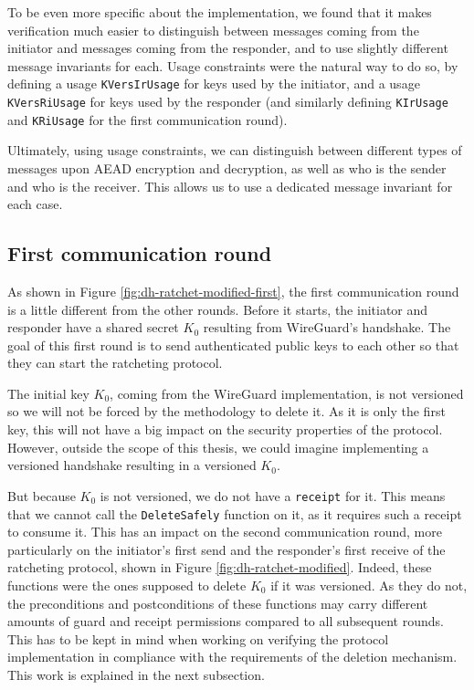 To be even more specific about the implementation, we found that it makes verification much easier to distinguish between messages coming from the initiator and messages coming from the responder, and to use slightly different message invariants for each.
Usage constraints were the natural way to do so, by defining a usage \texttt{KVersIrUsage} for keys used by the initiator, and a usage \texttt{KVersRiUsage} for keys used by the responder (and similarly defining \texttt{KIrUsage} and \texttt{KRiUsage} for the first communication round).

Ultimately, using usage constraints, we can distinguish between different types of messages upon AEAD encryption and decryption, as well as who is the sender and who is the receiver. This allows us to use a dedicated message invariant for each case.


\subsection{First communication round}
\label{sec:first-communication-round}

As shown in Figure \ref{fig:dh-ratchet-modified-first}, the first communication round is a little different from the other rounds.
Before it starts, the initiator and responder have a shared secret $K_0$ resulting from WireGuard's handshake.
The goal of this first round is to send authenticated public keys to each other so that they can start the ratcheting protocol.

The initial key $K_0$, coming from the WireGuard implementation, is not versioned so we will not be forced by the methodology to delete it. As it is only the first key, this will not have a big impact on the security properties of the protocol. However, outside the scope of this thesis, we could imagine implementing a versioned handshake resulting in a versioned $K_0$.

But because $K_0$ is not versioned, we do not have a \texttt{receipt} for it.
This means that we cannot call the \texttt{DeleteSafely} function on it, as it requires such a receipt to consume it.
This has an impact on the second communication round, more particularly on the initiator's first send and the responder's first receive of the ratcheting protocol, shown in Figure \ref{fig:dh-ratchet-modified}.
Indeed, these functions were the ones supposed to delete $K_0$ if it was versioned.
As they do not, the preconditions and postconditions of these functions may carry different amounts of guard and receipt permissions compared to all subsequent rounds.
This has to be kept in mind when working on verifying the protocol implementation in compliance with the requirements of the deletion mechanism.
This work is explained in the next subsection.

